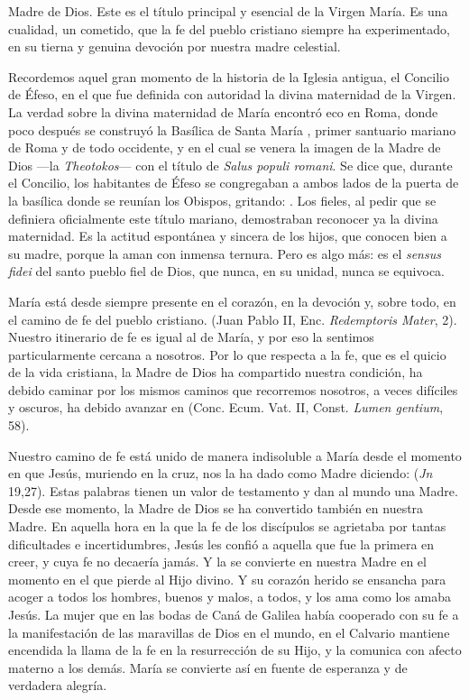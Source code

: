 \begin{body}
\begin{body}
{Madre de Dios. Este es el título principal y esencial de la Virgen María. Es una cualidad, un cometido, que la fe del pueblo cristiano siempre ha experimentado, en su tierna y genuina devoción por nuestra madre celestial.

Recordemos aquel gran momento de la historia de la Iglesia antigua, el Concilio de Éfeso, en el que fue definida con autoridad la divina maternidad de la Virgen. La verdad sobre la divina maternidad de María encontró eco en Roma, donde poco después se construyó la Basílica de Santa María , primer santuario mariano de Roma y de todo occidente, y en el cual se venera la imagen de la Madre de Dios ---la \emph{Theotokos}--- con el título de \emph{Salus populi romani}. Se dice que, durante el Concilio, los habitantes de Éfeso se congregaban a ambos lados de la puerta de la basílica donde se reunían los Obispos, gritando: . Los fieles, al pedir que se definiera oficialmente este título mariano, demostraban reconocer ya la divina maternidad. Es la actitud espontánea y sincera de los hijos, que conocen bien a su madre, porque la aman con inmensa ternura. Pero es algo más: es el \emph{sensus fidei} del santo pueblo fiel de Dios, que nunca, en su unidad, nunca se equivoca.

María está desde siempre presente en el corazón, en la devoción y, sobre todo, en el camino de fe del pueblo cristiano.  (Juan Pablo II, Enc. \emph{Redemptoris Mater}, 2). Nuestro itinerario de fe es igual al de María, y por eso la sentimos particularmente cercana a nosotros. Por lo que respecta a la fe, que es el quicio de la vida cristiana, la Madre de Dios ha compartido nuestra condición, ha debido caminar por los mismos caminos que recorremos nosotros, a veces difíciles y oscuros, ha debido avanzar en  (Conc. Ecum. Vat. II, Const. \emph{Lumen gentium}, 58).

Nuestro camino de fe está unido de manera indisoluble a María desde el momento en que Jesús, muriendo en la cruz, nos la ha dado como Madre diciendo:  (\emph{Jn} 19,27). Estas palabras tienen un valor de testamento y dan al mundo una Madre. Desde ese momento, la Madre de Dios se ha convertido también en nuestra Madre. En aquella hora en la que la fe de los discípulos se agrietaba por tantas dificultades e incertidumbres, Jesús les confió a aquella que fue la primera en creer, y cuya fe no decaería jamás. Y la  se convierte en nuestra Madre en el momento en el que pierde al Hijo divino. Y su corazón herido se ensancha para acoger a todos los hombres, buenos y malos, a todos, y los ama como los amaba Jesús. La mujer que en las bodas de Caná de Galilea había cooperado con su fe a la manifestación de las maravillas de Dios en el mundo, en el Calvario mantiene encendida la llama de la fe en la resurrección de su Hijo, y la comunica con afecto materno a los demás. María se convierte así en fuente de esperanza y de verdadera alegría.

}
\end{body}
\end{body}
